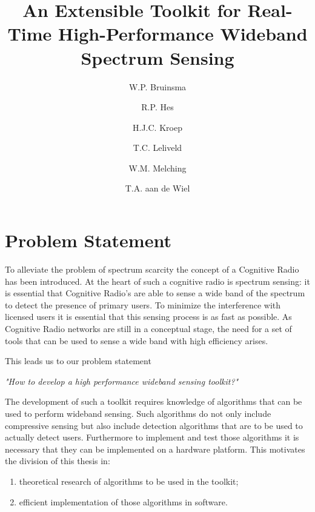 \documentclass[a4paper, openany, oneside]{memoir}
\title{An Extensible Toolkit for Real-Time High-Performance Wideband Spectrum Sensing}
\author{W.P. Bruinsma \and R.P. Hes \and H.J.C. Kroep \and T.C. Leliveld \and W.M. Melching \and T.A. aan de Wiel}
\begin{document}
\chapter{Problem Statement} \label{cha:problem_statement}
To alleviate the problem of spectrum scarcity the concept of a Cognitive Radio has been introduced.
At the heart of such a cognitive radio is spectrum sensing: it is essential that Cognitive Radio's are able to sense a wide band of the spectrum to detect the presence of primary users. To minimize the interference with licensed users it is essential that this sensing process is as fast as possible. As Cognitive Radio networks are still in a conceptual stage, the need for a set of tools that can be used to sense a wide band with high efficiency arises.

This leads us to our problem statement 

\emph{"How to develop a high performance wideband sensing toolkit?"}

The development of such a toolkit requires knowledge of algorithms that can be used to perform wideband sensing. Such algorithms do not only include compressive sensing but also include detection algorithms that are to be used to actually detect users. Furthermore to implement and test those algorithms it is necessary that they can be implemented on a hardware platform. This motivates the division of this thesis in:

\begin{enumerate}
	\item theoretical research of algorithms to be used in the toolkit;
	\item efficient implementation of those algorithms  in software.
\end{enumerate}
\end{document}
